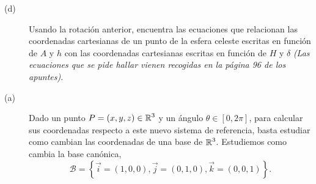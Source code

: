 \documentclass{article}
\begin{document}
\begin{ej}
\begin{description}
	\item[(d)] Usando la rotación anterior, encuentra las ecuaciones que relacionan las coordenadas cartesianas de un punto de la esfera celeste escritas en función de $\displaystyle A $ y $\displaystyle h $ con las coordenadas cartesianas escritas en función de $\displaystyle H $ y $\displaystyle \delta  $ \textit{(Las ecuaciones que se pide hallar vienen recogidas en la página 96 de los apuntes)}.
\end{description}
\end{ej}
\begin{sol}
\begin{description}
	\item[(a)] Dado un punto $\displaystyle P = \left(x,y,z\right) \in \mathbb{R}^{3} $ y un ángulo $\displaystyle \theta \in \left[0,2\pi \right] $, para calcular sus coordenadas respecto a este nuevo sistema de referencia, basta estudiar como cambian las coordenadas de una base de $\displaystyle \mathbb{R}^{3} $. Estudiemos como cambia la base canónica,  
		\[ \mathcal{B} = \left\{ \vec{i} = \left(1,0,0\right), \vec{j} = \left(0,1,0\right), \vec{k} = \left(0,0,1\right)\right\}.\]
		

\end{description}
\end{sol}
\end{document}
